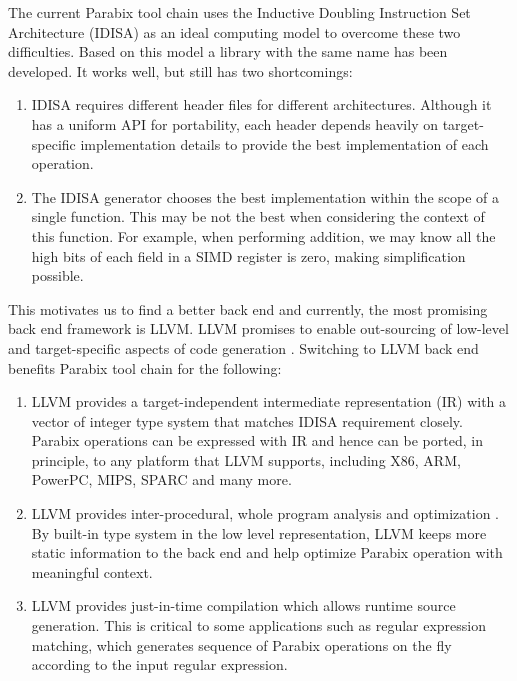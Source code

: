 The current Parabix tool chain uses the Inductive Doubling Instruction Set Architecture (IDISA) as an ideal computing model to overcome these two difficulties. Based on this model a library with the same name has been developed. It works well, but still has two shortcomings:

\begin{enumerate}
  \item IDISA requires different header files for different architectures. Although it has a uniform API for portability, each header depends heavily on target-specific implementation details to provide the best implementation of each operation.
  \item The IDISA generator \cite{hua_idisa} chooses the best implementation within the scope of a single function. This may be not the best when considering the context of this function. For example, when performing addition, we may know all the high bits of each field in a SIMD register is zero, making simplification possible.
\end{enumerate}

This motivates us to find a better back end and currently, the most promising back end framework is LLVM\@. LLVM promises to enable out-sourcing of low-level and target-specific aspects of code generation \cite{llvm_ghc, chris_msthesis}. Switching to LLVM back end benefits Parabix tool chain for the following:

\begin{enumerate}
  \item LLVM provides a target-independent intermediate representation (IR) with a vector of integer type system that matches IDISA requirement closely. Parabix operations can be expressed with IR and hence can be ported, in principle, to any platform that LLVM supports, including X86, ARM, PowerPC, MIPS, SPARC and many more.
  \item LLVM provides inter-procedural, whole program analysis and optimization \cite{llvm_cgo04}. By built-in type system in the low level representation, LLVM keeps more static information to the back end and help optimize Parabix operation with meaningful context.
  \item LLVM provides just-in-time compilation which allows runtime source generation. This is critical to some applications such as regular expression matching, which generates sequence of Parabix operations on the fly according to the input regular expression.
\end{enumerate}

